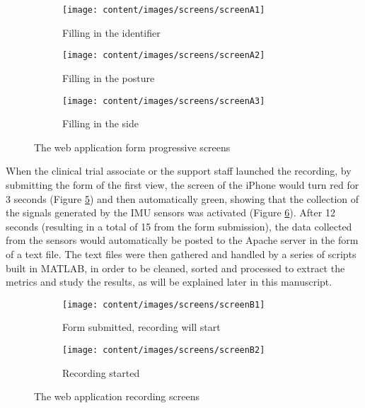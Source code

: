 \begin{figure}[h]
\centering
\begin{subfigure}{.33\textwidth}
  \centering
  \texttt{[image: content/images/screens/screenA1]}
  \caption{Filling in the identifier}
  \label{fig:webAppForm1}
\end{subfigure}%
\begin{subfigure}{.33\textwidth}
  \centering
  \texttt{[image: content/images/screens/screenA2]}
  \caption{Filling in the posture}
  \label{fig:webAppForm2}
\end{subfigure}
\begin{subfigure}{.33\textwidth}
  \centering
  \texttt{[image: content/images/screens/screenA3]}
  \caption{Filling in the side}
  \label{fig:webAppForm3}
\end{subfigure}
\caption{The web application form progressive screens}
\label{fig:webAppForm}
\end{figure}

When the clinical trial associate or the support staff launched the recording, by submitting the form of the first view, the screen of the iPhone would turn red for 3 seconds (Figure \ref{fig:webApp1}) and then automatically green, showing that the collection of the signals generated by the \gls{IMU} sensors was activated (Figure \ref{fig:webApp2}). After 12 seconds (resulting in a total of 15 from the form submission), the data collected from the sensors would automatically be posted to the Apache server in the form of a text file. The text files were then gathered and handled by a series of scripts built in MATLAB, in order to be cleaned, sorted and processed to extract the metrics and study the results, as will be explained later in this manuscript. 

\begin{figure}[h]
\centering
\begin{subfigure}{.5\textwidth}
  \centering
  \texttt{[image: content/images/screens/screenB1]}
  \caption{Form submitted, recording will start}
  \label{fig:webApp1}
\end{subfigure}%
\begin{subfigure}{.5\textwidth}
  \centering
  \texttt{[image: content/images/screens/screenB2]}
  \caption{Recording started}
  \label{fig:webApp2}
\end{subfigure}
\caption{The web application recording screens}
\label{fig:webApp}
\end{figure}

